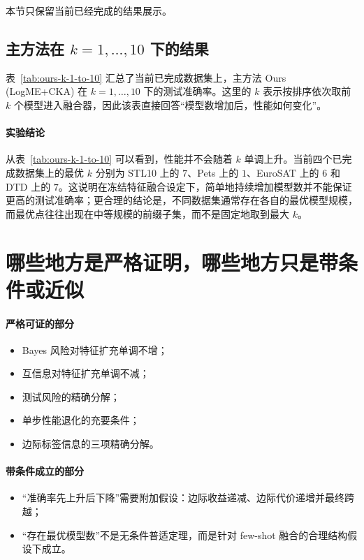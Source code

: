 \documentclass[UTF8,fontset=fandol]{ctexart}
\theoremstyle{remark}
\begin{document}
本节只保留当前已经完成的结果展示。

\subsection{主方法在 $k=1,\dots,10$ 下的结果}

表~\ref{tab:ours-k-1-to-10} 汇总了当前已完成数据集上，主方法 Ours (LogME+CKA) 在 $k=1,\dots,10$ 下的测试准确率。这里的 $k$ 表示按排序依次取前 $k$ 个模型进入融合器，因此该表直接回答“模型数增加后，性能如何变化”。



\paragraph{实验结论}
从表~\ref{tab:ours-k-1-to-10} 可以看到，性能并不会随着 $k$ 单调上升。当前四个已完成数据集上的最优 $k$ 分别为 STL10 上的 $7$、Pets 上的 $1$、EuroSAT 上的 $6$ 和 DTD 上的 $7$。这说明在冻结特征融合设定下，简单地持续增加模型数并不能保证更高的测试准确率；更合理的结论是，不同数据集通常存在各自的最优模型规模，而最优点往往出现在中等规模的前缀子集，而不是固定地取到最大 $k$。

\section{哪些地方是严格证明，哪些地方只是带条件或近似}

\paragraph{严格可证的部分}
\begin{itemize}
    \item Bayes 风险对特征扩充单调不增；
    \item 互信息对特征扩充单调不减；
    \item 测试风险的精确分解；
    \item 单步性能退化的充要条件；
    \item 边际标签信息的三项精确分解。
\end{itemize}

\paragraph{带条件成立的部分}
\begin{itemize}
    \item “准确率先上升后下降”需要附加假设：边际收益递减、边际代价递增并最终跨越；
    \item “存在最优模型数”不是无条件普适定理，而是针对 few-shot 融合的合理结构假设下成立。
\end{itemize}
\end{document}
